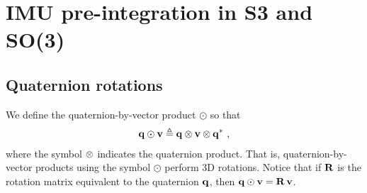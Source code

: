 

\newcommand{\bw}{{\bfomega}}
\newcommand{\bth}{{\bftheta}}
\newcommand{\bphi}{{\bfphi}}
\newcommand{\nth}{\norm{\bth}}
\newcommand{\ab}{{\bfa_b}}
\newcommand{\wb}{{\bw_b}}
\newcommand{\D}{\Delta}
\newcommand{\Dzero}{{\D^0}}
\newcommand{\Dp}{{\D\bfp}}
\newcommand{\Dv}{{\D\bfv}}
\newcommand{\Dth}{{\D\bth}}
\newcommand{\Dq}{{\D\bfq}}
\newcommand{\DR}{{\D\bfR}}
\newcommand{\DP}{{\D\bfP}}
\newcommand{\DV}{{\D\bfV}}
\newcommand{\DTH}{{\D\bfTheta}}
\newcommand{\Dw}{{\D\bw}}
\newcommand{\DW}{{\D\bfOmega}}
\newcommand{\dpp}{{\delta\bfp}}
\newcommand{\dv}{{\delta\bfv}}
\newcommand{\dth}{{\delta\bth}}
\newcommand{\dq}{{\delta\bfq}}
\newcommand{\dR}{{\delta\bfR}}
\newcommand{\dP}{{\delta\bfP}}
\newcommand{\dV}{{\delta\bfV}}
\newcommand{\dTH}{{\delta\bfTheta}}
\newcommand{\dw}{{\delta\bw}}

\newcommand{\te}{\triangleq}
\newcommand{\od}{\odot}

\newcommand{\tcom}[1]{{\footnotesize/\texttt{#1}/} }
\newcommand{\com}[1]{{\footnotesize/\texttt{#1}/~} }
\newcommand{\cdef}{\com{def}}
\newcommand{\cchain}{\com{chain}}
\newcommand{\ccross}{\com{cross}}
\newcommand{\cJr}{\com{Jr}}
\newcommand{\csmall}{\com{small}}
\newcommand{\cswap}{\com{swap}}
\newcommand{\ctrans}{\com{trans}}
\newcommand{\clog}{\com{Log}}
\newcommand{\clim}{\com{lim}}
\newcommand{\ccancel}{\com{cancel}}
\newcommand{\cexpand}{\com{expand}}
\newcommand{\csubst}{\com{subst}}

\section{IMU pre-integration in S3 and SO(3)}


\subsection{Quaternion rotations}

We define the quaternion-by-vector product $\od$ so that
%
\begin{align}
\bfq\od\bfv \te \bfq\ot\bfv\ot\bfq^*
~,
\end{align}
%
where the symbol $\otimes$ indicates the quaternion product.
That is, quaternion-by-vector products using the symbol $\od$ perform 3D rotations. 
Notice that if ${\bf R}$ is the rotation matrix equivalent to the quaternion ${\bf q}$, then $\bfq\od\bfv = \bfR\,\bfv$. 


